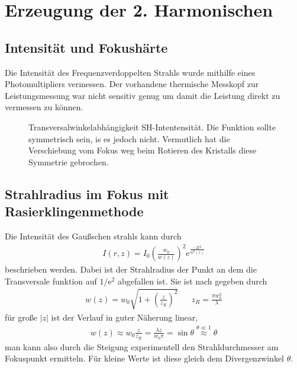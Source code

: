 \documentclass[11pt,twoside=semi]{scrartcl}
\newcommand{\e}{\mathrm{e}}
\begin{document}
\newpage

\section{Erzeugung der 2. Harmonischen}
\subsection{Intensität und Fokushärte}
Die Intensität des Frequenzverdoppelten Strahls wurde mithilfe eines
Photomultipliers vermessen. Der vorhandene thermische Messkopf zur Leistungsmessung
war nicht sensitiv genug um damit die Leistung direkt zu vermessen zu können.


\begin{figure}[H]
  \begin{floatrow}
    {%
      \caption{Transversalwinkelabhängigkeit SH-Intentensität. Die Funktion
      sollte symmetrisch sein, is es jedoch nicht. Vermutlich hat die Verschiebung vom Fokus
      weg beim Rotieren des Kristalls diese Symmetrie gebrochen. }
      \label{fig:angle_shg}
    }
  \end{floatrow}
  \end{figure}
  

\subsection{Strahlradius im Fokus mit Rasierklingenmethode}
Die Intensität des Gaußschen strahls kann durch
%
\begin{align*}
  I(r, z) = I_0\left( \frac{w_0}{w(z)} \right)^2 \e^{\frac{-2 r^2}{w^2(z)}}
\end{align*}
%
beschrieben werden. Dabei ist der Strahlradius der Punkt an
dem die Transversale funktion auf $1/\e^2$ abgefallen ist. Sie ist 
nach \cite{gaussbeamwiki} gegeben durch
%
\begin{align*}
  w(z) = w_0 \sqrt{1 + \left( \frac{z}{z_R} \right)^2} && z_R = \frac{\pi w_0^2}{\lambda}
\end{align*}
%
für große $|z|$ ist der Verlauf in guter Näherung linear,
%
\begin{align*}
  w(z) \approx w_0 \frac{z}{z_R} = \frac{\lambda z}{w_0 \pi} = \sin{\theta} 
                      \overset{\theta \ll 1}{\approx} \theta
\end{align*}
%
man kann also durch die Steigung experimentell den Strahldurchmesser
am Fokuspunkt ermitteln. Für kleine Werte ist diese gleich dem Divergenzwinkel
$\theta$. 
\end{document}
